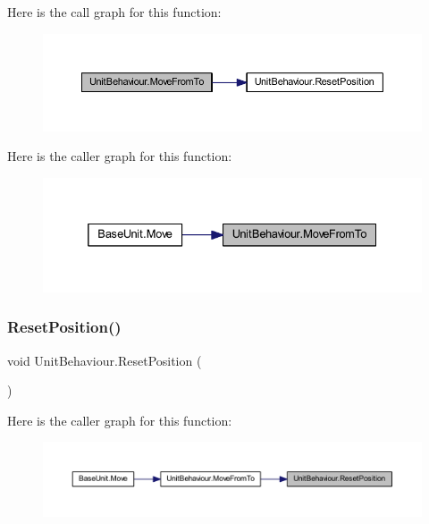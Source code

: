 Here is the call graph for this function\+:\nopagebreak
\begin{figure}[H]
\begin{center}
\leavevmode
\includegraphics[width=350pt]{class_unit_behaviour_a46ff5685dd97f930e6e2a835e01efb4d_cgraph}
\end{center}
\end{figure}
Here is the caller graph for this function\+:\nopagebreak
\begin{figure}[H]
\begin{center}
\leavevmode
\includegraphics[width=332pt]{class_unit_behaviour_a46ff5685dd97f930e6e2a835e01efb4d_icgraph}
\end{center}
\end{figure}
\mbox{\label{class_unit_behaviour_a19e4ade6b8de90c269e3ed840d0c9f84}} 
\subsubsection{\texorpdfstring{ResetPosition()}{ResetPosition()}}
{\footnotesize\ttfamily void Unit\+Behaviour.\+Reset\+Position (\begin{DoxyParamCaption}{ }\end{DoxyParamCaption})}

Here is the caller graph for this function\+:\nopagebreak
\begin{figure}[H]
\begin{center}
\leavevmode
\includegraphics[width=350pt]{class_unit_behaviour_a19e4ade6b8de90c269e3ed840d0c9f84_icgraph}
\end{center}
\end{figure}
\mbox{\label{class_unit_behaviour_a4b2664ef7a33e795220d587cb789d169}} 

